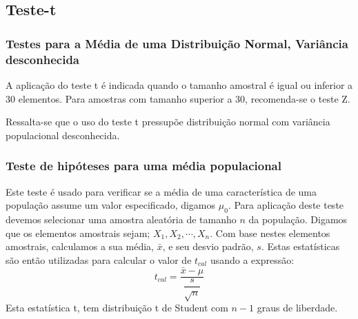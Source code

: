 \documentclass[14pt,aspectratio=1610]{beamer}
\newcommand{\bx}{\ensuremath{\bar{x}}}
\begin{document}
\subsection{Teste-t}
\begin{frame}{}
\frametitle{Testes para a Média de uma Distribuição Normal, Variância desconhecida}
\begin{block}{}
\justifying
A aplicação do teste t é indicada quando o tamanho amostral é igual ou inferior a 30 elementos. Para amostras com tamanho superior a 30, recomenda-se o teste Z. 
\end{block}
\pause
\begin{block}{}
\justifying
Ressalta-se que o uso do teste t pressupõe distribuição normal com variância populacional desconhecida. 
\end{block}
\end{frame}

\begin{frame}{}
\frametitle{Teste de hipóteses para uma média populacional}
\begin{block}{}
\justifying
Este teste é usado para verificar se a média de uma característica de uma população assume um valor especificado, 
digamos $\mu_{0}$. Para aplicação deste teste devemos selecionar uma amostra aleatória de tamanho $n$ da população. 
Digamos que os elementos amostrais sejam; $X_{1},X_{2},\cdots,X_{n}.$ Com base nestes elementos amostrais, 
calculamos a sua média, $\bx$, e seu desvio padrão, $s$. Estas estatísticas são então utilizadas para calcular o valor de $t_{cal}$ 
usando a expressão:
$$t_{cal}=\dfrac{\bx-\mu}{\dfrac{s}{\sqrt{n}}}$$
Esta estatística t, tem distribuição t de Student com $n-1$ graus de liberdade. 
\end{block}
\end{frame}
\end{document}
